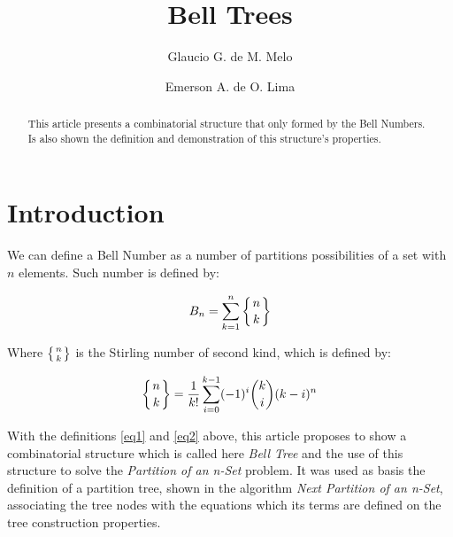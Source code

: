 \documentclass {amsart}
\newcommand{\emerson}{Emerson A. de O. Lima}
\newcommand{\glaucio}{Glaucio G. de M. Melo}
\begin{document}
\title[Bell Trees]
 {Bell Trees}
\author[Melo]{\glaucio}
\address[Melo]{Departamento de Estat\'{\i}stica e Inform\'{a}tica - UNICAP}
\author[Oliveira-Lima]{\emerson}
\address[Oliveira-Lima]{Departamento de Estat\'{\i}stica e Inform\'{a}tica - UNICAP}
\begin{abstract}
This article presents a combinatorial structure that only formed
by the Bell Numbers. Is also shown the definition and
demonstration of this structure's properties.
\end{abstract}
 \maketitle
\section*{Introduction}
We can define a Bell Number as a number of partitions possibilities of a
set with {$n$} elements. Such number is defined by:

\begin{equation} \label{eq1}
B_n = \sum_{k=1}^{n} \bigg\{{n\atop k}\bigg\}
\end{equation}

Where {$\big\{{n\atop k}\big\}$} is the Stirling number of second
kind, which is defined by:

\begin{equation} \label{eq2}
\bigg\{{n\atop k}\bigg\} = \frac{1}{k!} \sum_{i=0}^{k-1}(-1)^i {k
\choose i}(k-i)^n
\end{equation}


With the definitions \ref{eq1} and \ref{eq2} above, this article
proposes to show a combinatorial structure which is called here
\emph{Bell Tree} and the use of this structure to solve the
\emph{Partition of an n-Set} problem. It was used as basis the
definition of a partition tree, shown in the algorithm \emph{Next
Partition of an n-Set}\cite{wi}, associating the tree nodes with
the equations which its terms are defined on the tree construction
properties.
\end{document}
